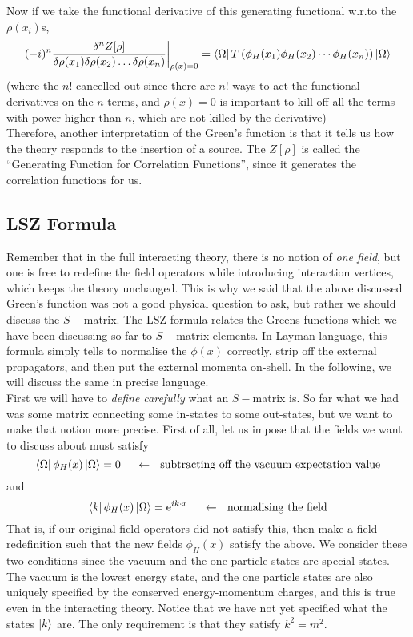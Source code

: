 \documentclass[11pt]{article}
\newcommand{\e}{\mathrm{e}}
\numberwithin{equation}{section}
\begin{document}
Now if we take the functional derivative of this generating functional w.r.to the \(\rho(x_i)\)s, 
\begin{equation*}
    (-i)^n\frac{\delta^n Z[\rho]}{\delta \rho(x_1)\delta \rho(x_2) \ldots {\delta \rho(x_n)}} \bigg|_{\rho(x) = 0}= \bra{\Omega} T\left(  \phi_H(x_1)\phi_H(x_2)\cdots \phi_H(x_n) \right) \ket{\Omega}
\end{equation*}
(where the \(n!\) cancelled out since there are \(n!\) ways to act the functional derivatives on the \(n\) terms, and \(\rho(x)=0\) is important to kill off all the terms with power higher than \(n\), which are not killed by the derivative)\\

Therefore, another interpretation of the Green's function is that it tells us how the theory responds to the insertion of a source. The \(Z[\rho]\) is called the ``Generating Function for Correlation Functions'', since it generates the correlation functions for us.

\subsection{LSZ Formula}  
Remember that in the full interacting theory, there is no notion of \textit{one field}, but one is free to redefine the field operators while introducing interaction vertices, which keeps the theory unchanged. This is why we said that the above discussed Green's function was not a good physical question to ask, but rather we should discuss the \(S-\)matrix.
The LSZ formula relates the Greens functions which we have been discussing so far to \(S-\)matrix elements. In Layman language, this formula simply tells to normalise the \(\phi(x)\) correctly, strip off the external propagators, and then put the external momenta on-shell. In the following, we will discuss the same in precise language.\\

First we will have to \textit{define carefully} what an \(S-\)matrix is. So far what we had was some matrix connecting some in-states to some out-states, but we want to make that notion more precise. First of all, let us impose that the fields we want to discuss about must satisfy  
\begin{equation*}
    \bra{\Omega} \phi_H(x) \ket{\Omega} = 0 ~~~~\leftarrow \text{~ subtracting off the vacuum expectation value}
\end{equation*}
and 
\begin{equation*}
    \bra{k} \phi_H(x) \ket{\Omega} = \e^{ik\cdot x}~~~~\leftarrow \text{~ normalising the field}
\end{equation*}
That is, if our original field operators did not satisfy this, then make a field redefinition such that the new fields \(\phi_H(x)\) satisfy the above. We consider these two conditions since the vacuum and the one particle states are special states. The vacuum is the lowest energy state, and the one particle states are also uniquely specified by the conserved energy-momentum charges, and this is true even in the interacting theory. Notice that we have not yet specified what the states \(\ket{k}\) are. The only requirement is that they satisfy \(k^2= m^2\). \\
\end{document}
